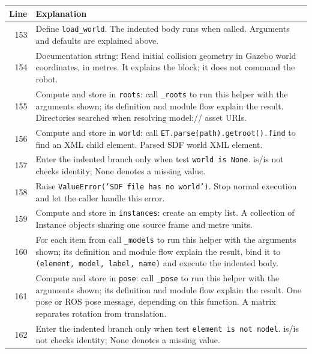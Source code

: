 \documentclass[11pt,a4paper]{book}
\begin{document}
\begin{longtable}{r p{}}

\textbf{Line} & \textbf{Explanation} \\ \hline \endhead

153 & Define \texttt{load\_world}. The indented body runs when called. Arguments and defaults are explained above. \\

154 & Documentation string: Read initial collision geometry in Gazebo world coordinates, in metres. It explains the block; it does not command the robot. \\

155 & Compute and store in \texttt{roots}: call \texttt{\_roots} to run this helper with the arguments shown; its definition and module flow explain the result. Directories searched when resolving model:// asset URIs. \\

156 & Compute and store in \texttt{world}: call \texttt{ET.parse(path).getroot().find} to find an XML child element. Parsed SDF world XML element. \\

157 & Enter the indented branch only when test \texttt{world is None}. is/is not checks identity; None denotes a missing value. \\

158 & Raise \texttt{ValueError('SDF file has no world')}. Stop normal execution and let the caller handle this error. \\

159 & Compute and store in \texttt{instances}: create an empty list. A collection of Instance objects sharing one source frame and metre units. \\

160 & For each item from call \texttt{\_models} to run this helper with the arguments shown; its definition and module flow explain the result, bind it to \texttt{(element, model, label, name)} and execute the indented body. \\

161 & Compute and store in \texttt{pose}: call \texttt{\_pose} to run this helper with the arguments shown; its definition and module flow explain the result. One pose or ROS pose message, depending on this function. A matrix separates rotation from translation. \\

162 & Enter the indented branch only when test \texttt{element is not model}. is/is not checks identity; None denotes a missing value. \\


\end{longtable}
\end{document}
